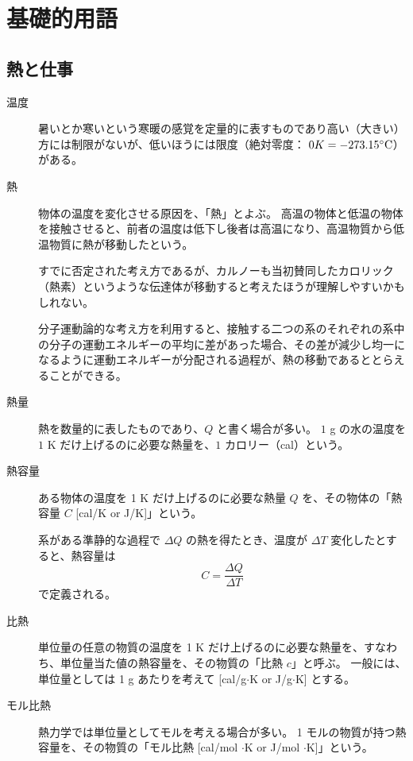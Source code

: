 \documentclass[uplatex,dvipdfmx,a4paper,11pt]{jsarticle}
\begin{document}
\newpage

\section{基礎的用語}

\subsection{熱と仕事}

\begin{description}
\item[温度]
暑いとか寒いという寒暖の感覚を定量的に表すものであり高い（大きい）方には制限がないが、低いほうには限度（絶対零度： $0K = -273.15 {}^\circ {\rm C}$）がある。

\item[熱]
物体の温度を変化させる原因を、「熱」とよぶ。
高温の物体と低温の物体を接触させると、前者の温度は低下し後者は高温になり、高温物質から低温物質に熱が移動したという。

すでに否定された考え方であるが、カルノーも当初賛同したカロリック（熱素）というような伝達体が移動すると考えたほうが理解しやすいかもしれない。

分子運動論的な考え方を利用すると、接触する二つの系のそれぞれの系中の分子の運動エネルギーの平均に差があった場合、その差が減少し均一になるように運動エネルギーが分配される過程が、熱の移動であるととらえることができる。

\item[熱量]
熱を数量的に表したものであり、$Q$ と書く場合が多い。
$1$ g の水の温度を $1$ K だけ上げるのに必要な熱量を、$1$ カロリー（cal）という。

\item[熱容量]
ある物体の温度を 1 K だけ上げるのに必要な熱量 $Q$ を、その物体の「熱容量 $C$ [cal/K or J/K]」という。

系がある準静的な過程で $\Delta Q$ の熱を得たとき、温度が $\Delta T$ 変化したとすると、熱容量は
\[C = \dfrac{\Delta Q}{\Delta T}\]
で定義される。 

\item[比熱]
単位量の任意の物質の温度を 1 K だけ上げるのに必要な熱量を、すなわち、単位量当た値の熱容量を、その物質の「比熱 $c$」と呼ぶ。
一般には、単位量としては 1 g あたりを考えて [cal/g$\cdot$K or J/g$\cdot$K] とする。

\item[モル比熱]
熱力学では単位量としてモルを考える場合が多い。
1 モルの物質が持つ熱容量を、その物質の「モル比熱 [cal/mol $\cdot$K or J/mol $\cdot$K]」という。


\end{description}
\end{document}
